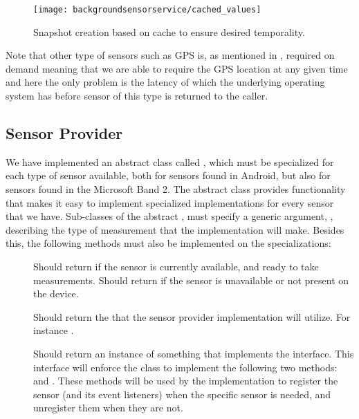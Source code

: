 \begin{figure}[!htbp]
    \centering
    \texttt{[image: backgroundsensorservice/cached\_values]}
    \caption{Snapshot creation based on cache to ensure desired temporality.}
    \label{fig:cached_values}
\end{figure}
\FloatBarrier

Note that other type of sensors such as GPS is, as mentioned in , required on demand meaning that we are able to require the GPS location at any given time and here the only problem is the latency of which the underlying operating system has before sensor of this type is returned to the caller.

\subsection{Sensor Provider}
\label{sub:providing_sensor_data_implementation}
We have implemented an abstract class called , which must be specialized for each type of sensor available, both for sensors found in Android, but also for sensors found in the Microsoft Band 2. The abstract class provides functionality that makes it easy to implement specialized implementations for every sensor that we have. Sub-classes of the abstract , must specify a generic argument, , describing the type of measurement that the implementation will make. Besides this, the following methods must also be implemented on the specializations:


\begin{description}
	\item[] Should return  if the sensor is currently available, and ready to take measurements. Should return  if the sensor is unavailable or not present on the device.

	\item[] Should return the  that the sensor provider implementation will utilize. For instance .

	\item[] Should return an instance of something that implements the  interface. This interface will enforce the class to implement the following two methods:  and . These methods will be used by the  implementation to register the sensor (and its event listeners) when the specific sensor is needed, and unregister them when they are not.
\end{description}

